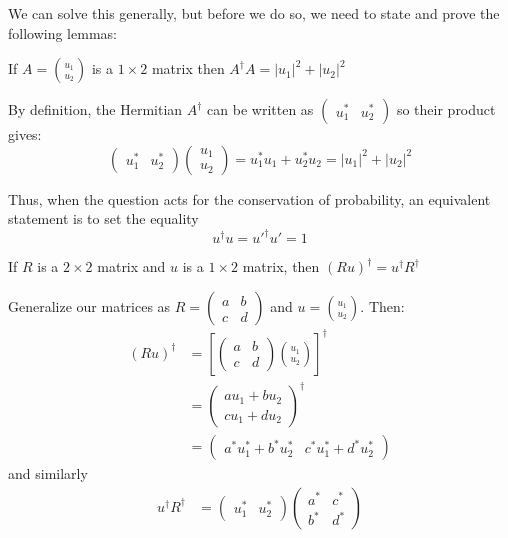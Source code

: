 \begin{sol}
We can solve this generally, but before we do so, we need to state and prove the following lemmas:
\newline
\begin{lemma}
If $\displaystyle A=\binom{u_1}{u_2}$ is a $1\times 2$ matrix then $A^\dagger A = |u_1|^2+|u_2|^2$
\end{lemma}

\begin{prooof}
By definition, the Hermitian $A^\dagger$ can be written as $\begin{pmatrix}u_1^* & u_2^*\end{pmatrix}$ so their product gives:
$$\begin{pmatrix}u_1^* & u_2^*\end{pmatrix}
\begin{pmatrix}u_1 \\ u_2\end{pmatrix} = u_1^*u_1 + u_2^*u_2 = |u_1|^2+|u_2|^2
$$
\end{prooof}
Thus, when the question acts for the conservation of probability, an equivalent statement is to set the equality
$$u^\dagger u=u'^\dagger u' = 1$$
\begin{lemma}
If $R$ is a $2\times 2$ matrix and $u$ is a $1\times2$ matrix, then $(Ru)^\dagger=u^\dagger R^\dagger$
\end{lemma}
\begin{prooof}
Generalize our matrices as $\displaystyle R = \begin{pmatrix} a & b \\ c & d\end{pmatrix}$ and $\displaystyle u=\binom{u_1}{u_2}$. Then:
\begin{align*}
    (Ru)^\dagger &= \left[\begin{pmatrix} a & b \\ c & d\end{pmatrix}\binom{u_1}{u_2}\right]^\dagger \\
    &= \begin{pmatrix}au_1+bu_2 \\ cu_1+du_2\end{pmatrix}^\dagger \\
    &= \begin{pmatrix}a^*u_1^*+b^*u_2^* & c^*u_1^*+d^*u_2^*\end{pmatrix}
\end{align*}
and similarly
\begin{align*}
    u^\dagger R^\dagger &= \begin{pmatrix}u_1^* & u_2^*\end{pmatrix}\begin{pmatrix} a^* & c^* \\ b^* & d^*\end{pmatrix} \\

\end{align*}
\end{prooof}
\end{sol}

